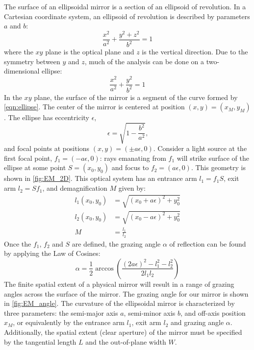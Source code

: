 The surface of an ellipsoidal mirror is a section of an ellipsoid of revolution. In a Cartesian coordinate system, an ellipsoid of revolution is described by parameters $a$ and $b$:
\begin{equation}
\frac{x^2}{a^2} + \frac{y^2 + z^2}{b^2} = 1
\end{equation}
where the $xy$ plane is the optical plane and $z$ is the vertical direction. Due to the symmetry between $y$ and $z$, much of the analysis can be done on a two-dimensional ellipse:
\begin{equation}
\frac{x^2}{a^2} + \frac{y^2}{b^2} = 1
\label{eqn:ellipse}
\end{equation}
In the $xy$ plane, the surface of the mirror is a segment of the curve formed by \cref{eqn:ellipse}. The center of the mirror is centered at position $(x,y)=(x_M, y_M)$. The ellipse has eccentricity $\epsilon$,
\begin{equation}
\epsilon = \sqrt{1-\frac{b^2}{a^2} } \text{,}
\end{equation}
and focal points at positions $(x,y) = (\pm a \epsilon,0)$. Consider a light source at the first focal point,  $f_1 = (-a \epsilon,0)$: rays emanating from $f_1$ will strike surface of the ellipse at some point $S = (x_0, y_0)$ and focus to $f_2 = (a \epsilon,0)$. This geometry is shown in \cref{fig:EM_2D}. This optical system has an entrance arm $l_1 = f_1S$, exit arm $l_2=Sf_1$, and demagnification $M$ given by:
\begin{align}
l_1(x_0, y_0) &= \sqrt{ (x_0+a \epsilon)^2 + y_0^2 } \\
l_2(x_0, y_0) &= \sqrt{ (x_0-a \epsilon)^2 + y_0^2 } \\
M &= \frac{l_1}{l_2}
\end{align}
Once the $f_1$, $f_2$ and $S$ are defined, the grazing angle $\alpha$ of reflection can be found by applying the Law of Cosines:
\begin{equation}
\alpha = \frac{1}{2} \arccos \left( \frac{(2 a \epsilon)^2 - l_1^2 - l_2^2}{2 l_1 l_2} \right)
\end{equation}
The finite spatial extent of a physical mirror will result in a range of grazing angles across the surface of the mirror. The grazing angle for our mirror is shown in \cref{fig:EM_angle}. The curvature of the ellipsoidal mirror is characterized by three parameters: the semi-major axis $a$, semi-minor axis $b$, and off-axis position $x_M$, or equivalently by the entrance arm $l_1$, exit arm $l_2$ and grazing angle $\alpha$. Additionally, the spatial extent (clear aperture) of the mirror must be specified by the tangential length $L$ and the out-of-plane width $W$.




